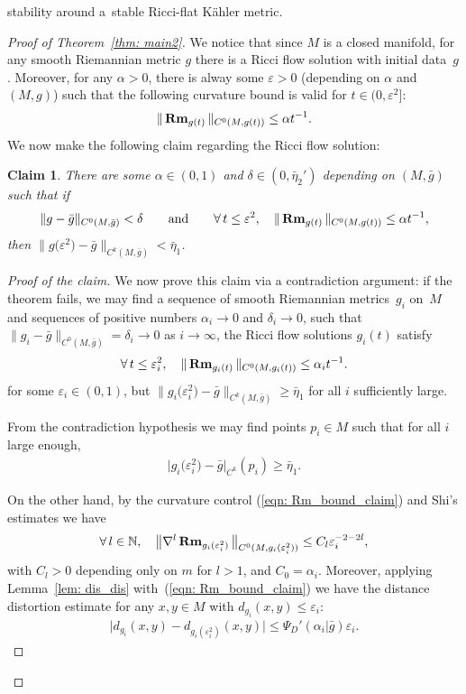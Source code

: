 \documentclass[pdftex]{sigma}
\numberwithin{equation}{section}
\newtheorem{Claim}[Theorem]{Claim}
 { \theoremstyle{definition}
\newtheorem{Example}[Theorem]{Example}
\newtheorem{Remark}[Theorem]{Remark} }
\newcommand{\Rm}{\operatorname{\bf Rm}}
\begin{document}
stability around a~stable Ricci-flat K\"ahler metric.
 \begin{proof}[Proof of Theorem~\ref{thm: main2}]
 We notice that since $M$ is a closed manifold, for
 any smooth Riemannian metric $g$ there is a Ricci flow solution with initial
 data~$g$. Moreover, for any $\alpha>0$, there is alway some $\varepsilon>0$
 (depending on $\alpha$ and $(M,g)$) such that the following curvature bound is
 valid for $t\in \big(0,\varepsilon^2\big]$:
\begin{align*}
 \|\Rm_{g(t)} \|_{C^0(M,g(t))} \le \alpha t^{-1}.
\end{align*}
We now make the following claim regarding the Ricci flow solution:
\begin{Claim}
There are some $\alpha \in (0,1)$ and $\delta\in (0,\bar{\eta}_2')$ depending on
$(M,\bar{g})$ such that if
\begin{align*} \|g-\bar{g} \|_{C^0(M,\bar{g})} < \delta\qquad
\text{and}\qquad \forall\, t\le
\varepsilon^2,\quad \|\Rm_{g(t)} \|_{C^0(M,g(t))} \le \alpha t^{-1},
\end{align*}
then $\big\|g\big(\varepsilon^2\big)-\bar{g}\big\|_{C^k(M,\bar{g})}<\bar{\eta}_1$.
\end{Claim}
\begin{proof}[Proof of the claim]
We now prove this claim via a contradiction argument: if the theorem fails,
 we may find a sequence of smooth Riemannian metrics~$g_i$ on~$M$ and sequences
 of positive numbers $\alpha_i\to 0$ and $\delta_i\to 0$, such that
 $ \|g_i-\bar{g} \|_{C^0(M,\bar{g})} =\delta_i\to 0$ as $i\to \infty$,
 the Ricci flow solutions $g_i(t)$ satisfy
\begin{align}\label{eqn: Rm_bound_claim}
\forall\, t\le \varepsilon_i^2,\quad \|\Rm_{g_i(t)} \|_{C^0(M,g_i(t))}
\le \alpha_i t^{-1}.
\end{align}
for some $\varepsilon_i\in (0,1)$, but $\big\|g_i\big(\varepsilon_i^2\big)
-\bar{g}\big\|_{C^k(M,\bar{g})} \ge \bar{\eta}_1$ for all $i$ sufficiently
large.

From the contradiction hypothesis we may find points $p_i\in M$ such that for
all $i$ large enough,
\begin{align}\label{eqn: C3_contradiction}
\big|g_i\big(\varepsilon_i^2\big)-\bar{g}\big|_{C^k}(p_i) \ge \bar{\eta}_1.
\end{align}

On the other hand, by the curvature control (\ref{eqn: Rm_bound_claim}) and
Shi's estimates we have
\begin{align}\label{eqn: regularity}
\forall\, l\in \mathbb{N},\quad
\big\|\nabla^l\Rm_{g_i(\varepsilon_i^2)}\big\|_{C^0(M,g_i(\varepsilon_i^2))}
\le C_l \varepsilon_i^{-2-2l},
\end{align}
with $C_l>0$ depending only on $m$ for $l>1$, and $C_0=\alpha_i$.
Moreover, applying Lemma~\ref{lem: dis_dis} with~(\ref{eqn: Rm_bound_claim}) we
have the distance distortion estimate for any $x,y\in M$ with $d_{g_i}(x,y)\le
\varepsilon_i$:
\begin{align*}
\big|d_{g_i}(x,y)-d_{g_i(\varepsilon_i^2)}(x,y)\big| \le
\Psi_D'(\alpha_i|\bar{g})\varepsilon_i.
\end{align*}


\end{proof}
\end{proof}
\end{document}
